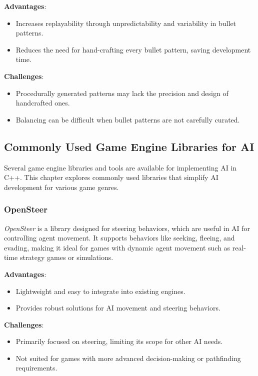 \textbf{Advantages}:
\begin{itemize}
    \item Increases replayability through unpredictability and variability in bullet patterns.
    \item Reduces the need for hand-crafting every bullet pattern, saving development time.
\end{itemize}

\textbf{Challenges}:
\begin{itemize}
    \item Procedurally generated patterns may lack the precision and design of handcrafted ones.
    \item Balancing can be difficult when bullet patterns are not carefully curated.
\end{itemize}

\subsection{Commonly Used Game Engine Libraries for AI}

Several game engine libraries and tools are available for implementing AI in C++. This chapter explores commonly used libraries that simplify AI development for various game genres.

\subsubsection{OpenSteer}

\textit{OpenSteer} is a library designed for steering behaviors, which are useful in AI for controlling agent movement. It supports behaviors like seeking, fleeing, and evading, making it ideal for games with dynamic agent movement such as real-time strategy games or simulations.

\textbf{Advantages}:
\begin{itemize}
    \item Lightweight and easy to integrate into existing engines.
    \item Provides robust solutions for AI movement and steering behaviors.
\end{itemize}

\textbf{Challenges}:
\begin{itemize}
    \item Primarily focused on steering, limiting its scope for other AI needs.
    \item Not suited for games with more advanced decision-making or pathfinding requirements.
\end{itemize}


